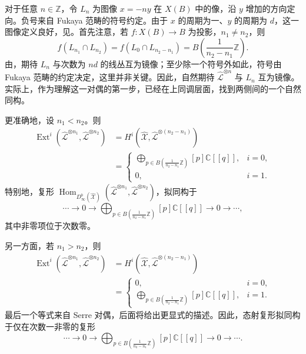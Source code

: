 对于任意 $n\in\mathbb Z$，令 $L_n$ 为图像 $x=-ny$ 在 $X(B)$ 中的像，沿 $y$ 增加的方向定向。负号来自 Fukaya 范畴的符号约定。由于 $x$ 的周期为一、$y$ 的周期为 $d$，这一图像定义良好，见。首先注意，若 $f\colon X(B)\to B$ 为投影，$n_1\neq n_2$，则
\[
f(L_{n_1}\cap L_{n_2})
=f(L_0\cap L_{n_2-n_1})
=B\left(\frac1{n_2-n_1}\mathbb Z\right).
\]
由，期待 $L_n$ 与次数为 $nd$ 的线丛互为镜像；至少除一个符号外如此，符号由 Fukaya 范畴的约定决定，这里并非关键。因此，自然期待 $\widehat{\mathcal L}^{\otimes n}$ 与 $L_n$ 互为镜像。实际上，作为理解这一对偶的第一步，已经在上同调层面，找到两侧间的一个自然同构。
\begin{figure}[H]
\centering
{}
\BookNumberOnlyCaption\label{fig:8.28}
\end{figure}

更准确地，设 $n_1<n_2$。则
\[
\begin{aligned}
\operatorname{Ext}^i(\widehat{\mathcal L}^{\otimes n_1},
\widehat{\mathcal L}^{\otimes n_2})
&=H^i(\widehat{\mathcal X},\widehat{\mathcal L}^{\otimes(n_2-n_1)})\\
&=\begin{cases}
\displaystyle\bigoplus_{p\in B(\frac1{n_2-n_1}\mathbb Z)}[p]\mathbb C[[q]],&i=0,\\
0,&i=1.
\end{cases}
\end{aligned}
\]
特别地，复形 $\operatorname{Hom}_{D^b_\infty(\widehat{\mathcal X})}
(\widehat{\mathcal L}^{\otimes n_1},\widehat{\mathcal L}^{\otimes n_2})$，拟同构于
\begin{equation}\label{eq:8.15}
\cdots\longrightarrow0\longrightarrow
\bigoplus_{p\in B(\frac1{n_2-n_1}\mathbb Z)}[p]\mathbb C[[q]]
\longrightarrow0\longrightarrow\cdots,
\end{equation}
其中非零项位于次数零。

另一方面，若 $n_1>n_2$，则
\[
\begin{aligned}
\operatorname{Ext}^i(\widehat{\mathcal L}^{\otimes n_1},
\widehat{\mathcal L}^{\otimes n_2})
&=H^i(\widehat{\mathcal X},\widehat{\mathcal L}^{\otimes(n_2-n_1)})\\
&=\begin{cases}
0,&i=0,\\
\displaystyle\bigoplus_{p\in B(\frac1{n_2-n_1}\mathbb Z)}[p]\mathbb C[[q]],&i=1.
\end{cases}
\end{aligned}
\]
最后一个等式来自 Serre 对偶，后面将给出更显式的描述。因此，态射复形拟同构于仅在次数一非零的复形
\begin{equation}\label{eq:8.16}
\cdots\longrightarrow0\longrightarrow
\bigoplus_{p\in B(\frac1{n_2-n_1}\mathbb Z)}[p]\mathbb C[[q]]
\longrightarrow0\longrightarrow\cdots.
\end{equation}

